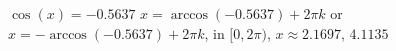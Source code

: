  {$\cos(x) = -0.5637$}
{ $x = \arccos(-0.5637) + 2\pi k$ or $x = - \arccos(-0.5637)  + 2\pi k$, in  $[0, 2\pi)$, $x \approx 2.1697, \, 4.1135$}
